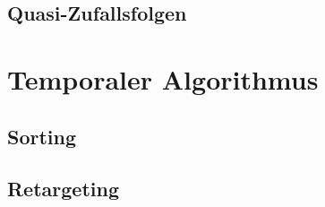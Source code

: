 \newpage
\section{Quasi-Zufallsfolgen}
\label{ch:Content1:sec:QuasiRandomSequences}





\newpage
\chapter{Temporaler Algorithmus}
\label{ch:TemporalerAlgorithmus}




\section{Sorting}
\label{ch:Content2:sec:Sorting}




\section{Retargeting}
\label{ch:Content2:sec:Retargeting}


